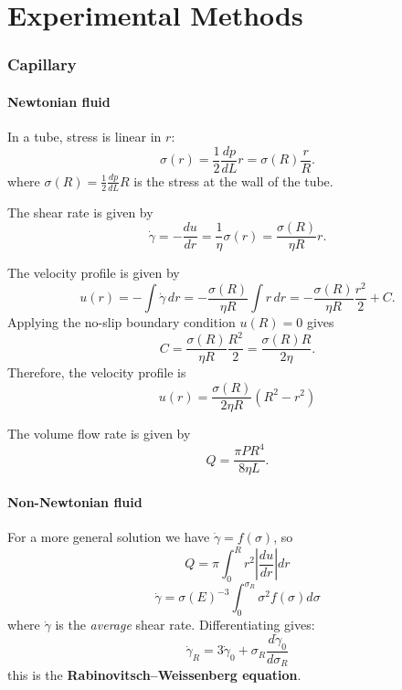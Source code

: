 \part{Experimental Methods}

\section{Capillary}
\subsection{Newtonian fluid}
In a tube, stress is linear in $r$:
\begin{equation}
	\sigma(r) = \frac12 \frac{dp}{dL} r
	= \sigma(R) \frac{r}{R}.
\end{equation}
where $\sigma(R) = \frac12 \frac{dp}{dL} R$ is the stress at the wall of the tube. 

The shear rate is given by
\begin{equation}
	\dot\gamma = -\frac{du}{dr} = \frac{1}{\eta}\sigma(r) = \frac{\sigma(R)}{\eta R}r .
\end{equation}

The velocity profile is given by
\begin{equation}
	u(r) = -\int \dot\gamma \, dr = -\frac{\sigma(R)}{\eta R} \int r \, dr = -\frac{\sigma(R)}{\eta R} \frac{r^2}{2} + C.
\end{equation}
Applying the no-slip boundary condition $u(R) = 0$ gives
\[
	C = \frac{\sigma(R)}{\eta R} \frac{R^2}{2} = \frac{\sigma(R) R}{2\eta}.
\]
Therefore, the velocity profile is
\begin{equation}
	u(r) = \frac{\sigma(R)}{2\eta R}\left(R^2 - r^2\right)
\end{equation}

The volume flow rate is given by
\begin{equation}
	Q = \frac{\pi PR^4}{8\eta L}.
\end{equation}

\subsection{Non-Newtonian fluid}
For a more general solution we have $\dot\gamma = f(\sigma)$, so
\[
	Q = \pi \int_0^R r^2 \left| \frac{du}{dr} \right| dr
\]
\[
	\dot\gamma = \sigma(E)^{-3} \int_0^{\sigma_R} \sigma^2 f(\sigma) d\sigma
\]
where $\dot\gamma$ is the \emph{average} shear rate.
Differentiating gives:
\[
	\dot\gamma_R = 3\dot\gamma_0 + \sigma_R\frac{d\dot\gamma_0}{d\sigma_R}
\]
this is the \textbf{Rabinovitsch--Weissenberg equation}.

